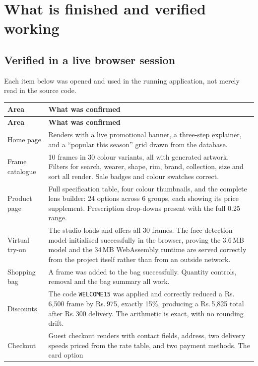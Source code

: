 \documentclass[11pt,a4paper]{report}
\newcommand{\code}[1]{\texttt{\small #1}}
\begin{document}
\chapter{What is finished and verified working}

\section{Verified in a live browser session}

Each item below was opened and used in the running application, not merely
read in the source code.

\begin{longtable}{@{}p{}p{}@{}}
\toprule
\textbf{Area} & \textbf{What was confirmed}\\
\midrule
\endfirsthead
\toprule
\textbf{Area} & \textbf{What was confirmed}\\
\midrule
\endhead
Home page & Renders with a live promotional banner, a three-step explainer,
and a ``popular this season'' grid drawn from the database.\\
\addlinespace
Frame catalogue & 10 frames in 30 colour variants, all with generated
artwork. Filters for search, wearer, shape, rim, brand, collection, size and
sort all render. Sale badges and colour swatches correct.\\
\addlinespace
Product page & Full specification table, four colour thumbnails, and the
complete lens builder: 24 options across 6 groups, each showing its price
supplement. Prescription drop-downs present with the full 0.25 range.\\
\addlinespace
Virtual try-on & The studio loads and offers all 30 frames. The face-detection
model initialised successfully in the browser, proving the 3.6\,MB model and
the 34\,MB WebAssembly runtime are served correctly from the project itself
rather than from an outside network.\\
\addlinespace
Shopping bag & A frame was added to the bag successfully. Quantity controls,
removal and the bag summary all work.\\
\addlinespace
Discounts & The code \code{WELCOME15} was applied and correctly reduced a
Rs.\,6{,}500 frame by Rs.\,975, exactly 15\%, producing a Rs.\,5{,}825 total
after Rs.\,300 delivery. The arithmetic is exact, with no rounding drift.\\
\addlinespace
Checkout & Guest checkout renders with contact fields, address, two delivery
speeds priced from the rate table, and two payment methods. The card option

\end{longtable}
\end{document}
